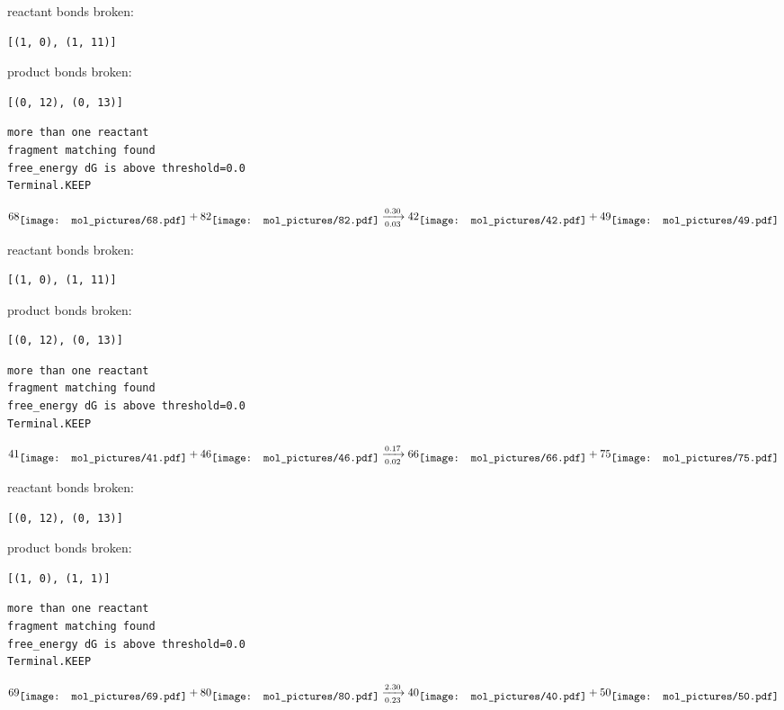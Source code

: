 \documentclass{article}
\begin{document}
reactant bonds broken:\begin{verbatim}
[(1, 0), (1, 11)]
\end{verbatim}
product bonds broken:\begin{verbatim}
[(0, 12), (0, 13)]
\end{verbatim}




\vspace{1cm}
\begin{verbatim}
more than one reactant
fragment matching found
free_energy dG is above threshold=0.0
Terminal.KEEP
\end{verbatim}
$$
68
\raisebox{-.5\height}{\texttt{[image: mol\_pictures/68.pdf]}}
+
82
\raisebox{-.5\height}{\texttt{[image: mol\_pictures/82.pdf]}}
\xrightarrow[0.03]{0.30}
42
\raisebox{-.5\height}{\texttt{[image: mol\_pictures/42.pdf]}}
+
49
\raisebox{-.5\height}{\texttt{[image: mol\_pictures/49.pdf]}}
$$


reactant bonds broken:\begin{verbatim}
[(1, 0), (1, 11)]
\end{verbatim}
product bonds broken:\begin{verbatim}
[(0, 12), (0, 13)]
\end{verbatim}




\vspace{1cm}
\begin{verbatim}
more than one reactant
fragment matching found
free_energy dG is above threshold=0.0
Terminal.KEEP
\end{verbatim}
$$
41
\raisebox{-.5\height}{\texttt{[image: mol\_pictures/41.pdf]}}
+
46
\raisebox{-.5\height}{\texttt{[image: mol\_pictures/46.pdf]}}
\xrightarrow[0.02]{0.17}
66
\raisebox{-.5\height}{\texttt{[image: mol\_pictures/66.pdf]}}
+
75
\raisebox{-.5\height}{\texttt{[image: mol\_pictures/75.pdf]}}
$$


reactant bonds broken:\begin{verbatim}
[(0, 12), (0, 13)]
\end{verbatim}
product bonds broken:\begin{verbatim}
[(1, 0), (1, 1)]
\end{verbatim}




\vspace{1cm}
\begin{verbatim}
more than one reactant
fragment matching found
free_energy dG is above threshold=0.0
Terminal.KEEP
\end{verbatim}
$$
69
\raisebox{-.5\height}{\texttt{[image: mol\_pictures/69.pdf]}}
+
80
\raisebox{-.5\height}{\texttt{[image: mol\_pictures/80.pdf]}}
\xrightarrow[0.23]{2.30}
40
\raisebox{-.5\height}{\texttt{[image: mol\_pictures/40.pdf]}}
+
50
\raisebox{-.5\height}{\texttt{[image: mol\_pictures/50.pdf]}}
$$
\end{document}

